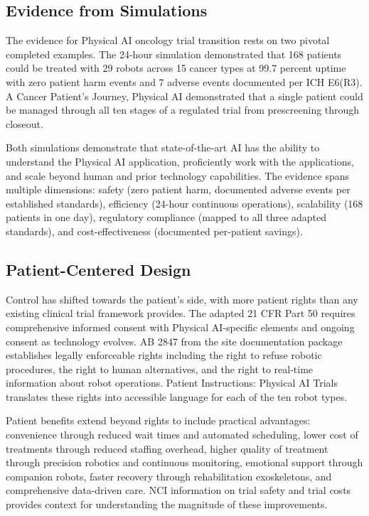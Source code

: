\subsection{Evidence from Simulations}
\label{subsec:discuss-evidence}

The evidence for Physical AI oncology trial transition rests on two pivotal
completed examples. The 24-hour simulation \cite{site-docs} demonstrated that
168 patients could be treated with 29 robots across 15 cancer types at 99.7
percent uptime with zero patient harm events and 7 adverse events documented
per ICH E6(R3). A Cancer Patient's Journey, Physical AI
\cite{patient-journey-paper} demonstrated that a single patient could be managed
through all ten stages of a regulated trial from prescreening through closeout.

Both simulations demonstrate that state-of-the-art AI has the ability to
understand the Physical AI application, proficiently work with the applications,
and scale beyond human and prior technology capabilities. The evidence spans
multiple dimensions: safety (zero patient harm, documented adverse events per
established standards), efficiency (24-hour continuous operations), scalability
(168 patients in one day), regulatory compliance (mapped to all three adapted
standards), and cost-effectiveness (documented per-patient savings).

\subsection{Patient-Centered Design}
\label{subsec:discuss-patient}

Control has shifted towards the patient's side, with more patient rights than
any existing clinical trial framework provides. The adapted 21 CFR Part 50
\cite{cfr50-adapt} requires comprehensive informed consent with Physical
AI-specific elements and ongoing consent as technology evolves. AB 2847 from the
site documentation package \cite{site-docs} establishes legally enforceable
rights including the right to refuse robotic procedures, the right to human
alternatives, and the right to real-time information about robot operations.
Patient Instructions: Physical AI Trials \cite{patient-instructions-paper}
translates these rights into accessible language for each of the ten robot types.

Patient benefits extend beyond rights to include practical advantages:
convenience through reduced wait times and automated scheduling, lower cost of
treatments through reduced staffing overhead, higher quality of treatment
through precision robotics and continuous monitoring, emotional support through
companion robots, faster recovery through rehabilitation exoskeletons, and
comprehensive data-driven care. NCI information on trial safety
\cite{nci-trials-safety} and trial costs \cite{nci-trials-paying} provides
context for understanding the magnitude of these improvements.

